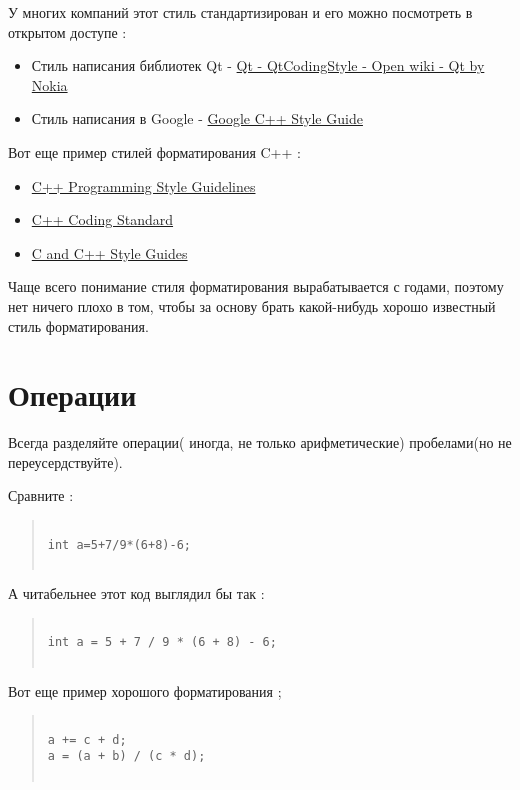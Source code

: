 У многих компаний этот стиль стандартизирован и его можно посмотреть в открытом доступе :
\begin{itemize}
\item Стиль написания библиотек Qt - \href{ http://qt.gitorious.org/qt/pages/QtCodingStyle}{ Qt - QtCodingStyle - Open wiki - Qt by Nokia}
\item Стиль написания в Google - \href{ http://google-styleguide.googlecode.com/svn/trunk/cppguide.xml}{ Google C++ Style Guide}
\end{itemize}

Вот еще пример стилей форматирования C++ :
\begin{itemize}
\item \href{ http://geosoft.no/development/cppstyle.html}{ C++ Programming Style Guidelines}
\item \href{ http://www.possibility.com/Cpp/CppCodingStandard.html}{ C++ Coding Standard}
\item \href{ http://www.chris-lott.org/resources/cstyle/}{ C and C++ Style Guides}
\end{itemize}

Чаще всего понимание стиля форматирования вырабатывается с годами, поэтому нет ничего плохо в том, чтобы за основу брать какой-нибудь хорошо известный стиль форматирования.

\section{  Операции }

Всегда разделяйте операции( иногда, не только арифметические) пробелами(но не переусердствуйте).

Сравните :
\begin{quote}
\begin{verbatim}
 
int a=5+7/9*(6+8)-6;
 
\end{verbatim}
\end{quote}
А читабельнее этот код выглядил бы так :
\begin{quote}
\begin{verbatim}
 
int a = 5 + 7 / 9 * (6 + 8) - 6;
 
\end{verbatim}
\end{quote}

Вот еще пример хорошого форматирования ;
\begin{quote}
\begin{verbatim}
 
a += c + d;
a = (a + b) / (c * d);
 
\end{verbatim}
\end{quote}

